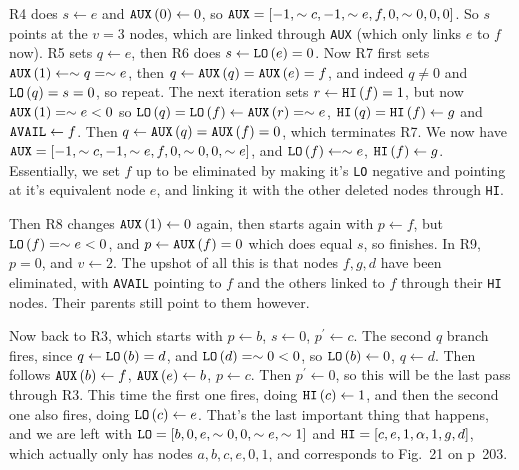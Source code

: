 R4 does $s \gets e$ and ${\tt AUX}\left(0\right) \gets 0$,
so ${\tt AUX} = \left[-1, \sim c, -1, \sim e, f, 0, \sim 0, 0, 0\right]$.
So $s$ points at the $v=3$ nodes, which are linked through {\tt AUX}
(which only links $e$ to $f$ now).  R5 sets $q \gets e$, then R6 does 
$s \gets {\tt LO}\left(e\right) = 0$.
Now R7 first sets ${\tt AUX}\left(1\right) \gets \sim q = \sim e$, then
$q \gets {\tt AUX}\left(q\right) = {\tt AUX}\left(e\right) = f$, and indeed
$q \ne 0$ and ${\tt LO}\left(q\right) = s = 0$, so repeat.  The next
iteration sets $r \gets {\tt HI}\left(f\right) = 1$, but now ${\tt AUX}\left(1\right) = \sim e
< 0$ so ${\tt LO}\left(q\right) = {\tt LO}\left(f\right) \gets {\tt AUX}\left(r\right) = \sim e$,
${\tt HI}\left(q\right) = {\tt HI}\left(f\right) \gets g$ and ${\tt AVAIL} \gets f$.
Then $q \gets {\tt AUX}\left(q\right) = {\tt AUX}\left(f\right) = 0$, which terminates R7.
We now have ${\tt AUX} = \left[-1, \sim c, -1, \sim e, f, 0, \sim 0, 0, \sim e\right]$,
and ${\tt LO}\left(f\right) \gets \sim e$, ${\tt HI}\left(f\right) \gets g$.
Essentially, we set $f$ up to be eliminated by making it's {\tt LO} negative
and pointing at it's equivalent node $e$, and linking it with the other
deleted nodes through {\tt HI}.

Then R8 changes ${\tt AUX}\left(1\right) \gets 0$ again, then starts again with
$p \gets f$, but ${\tt LO}\left(f\right) = \sim e < 0$, and $p \gets {\tt AUX}\left(f\right)
= 0$ which does equal $s$, so finishes.  In R9, $p = 0$, and $v \gets 2$.
The upshot of all this is that nodes $f, g, d$ have been eliminated,
with {\tt AVAIL} pointing to $f$ and the others linked to $f$ through their {\tt HI}
nodes.  Their parents still point to them however.

Now back to R3, which starts with $p \gets b$, $s \gets 0$, $p^{\prime} \gets c$.
The second $q$ branch fires, since $q \gets {\tt LO}\left(b\right) = d$,
and ${\tt LO}\left(d\right) = \sim 0 < 0$, so ${\tt LO}\left(b\right) \gets 0$,
$q \gets d$.  Then follows
${\tt AUX}\left(b\right) \gets f$, ${\tt AUX}\left(e\right) \gets b$, $p \gets c$.
Then $p^{\prime} \gets 0$, so this will be the last pass through R3.
This time the first one fires, doing ${\tt HI}\left(c\right) \gets 1$,
and then the second one also fires, doing ${\tt LO}\left(c\right) \gets e$.
That's the last important thing that happens, and we are left with
${\tt LO} = \left[ b, 0, e, \sim 0, 0, \sim e, \sim 1\right]$
and ${\tt HI} = \left[c, e, 1, \alpha, 1, g, d \right]$, which actually
only has nodes $a, b, c, e, 0, 1$, and corresponds to Fig.~21 on p~203.

